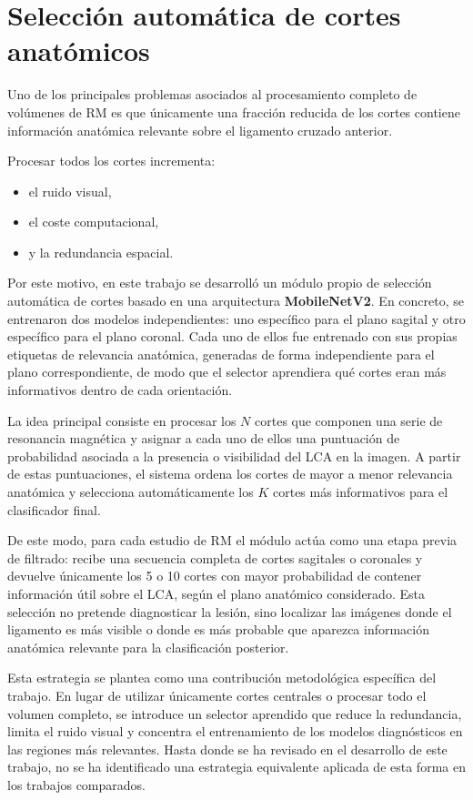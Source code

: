 \section{Selección automática de cortes anatómicos}

Uno de los principales problemas asociados al procesamiento completo de volúmenes de RM es que únicamente una fracción reducida de los cortes contiene información anatómica relevante sobre el ligamento cruzado anterior.

Procesar todos los cortes incrementa:
\begin{itemize}
    \item el ruido visual,
    \item el coste computacional,
    \item y la redundancia espacial.
\end{itemize}

Por este motivo, en este trabajo se desarrolló un módulo propio de selección automática de cortes basado en una arquitectura \textbf{MobileNetV2}. En concreto, se entrenaron dos modelos independientes: uno específico para el plano sagital y otro específico para el plano coronal. Cada uno de ellos fue entrenado con sus propias etiquetas de relevancia anatómica, generadas de forma independiente para el plano correspondiente, de modo que el selector aprendiera qué cortes eran más informativos dentro de cada orientación.

La idea principal consiste en procesar los $N$ cortes que componen una serie de resonancia magnética y asignar a cada uno de ellos una puntuación de probabilidad asociada a la presencia o visibilidad del LCA en la imagen. A partir de estas puntuaciones, el sistema ordena los cortes de mayor a menor relevancia anatómica y selecciona automáticamente los $K$ cortes más informativos para el clasificador final.

De este modo, para cada estudio de RM el módulo actúa como una etapa previa de filtrado: recibe una secuencia completa de cortes sagitales o coronales y devuelve únicamente los 5 o 10 cortes con mayor probabilidad de contener información útil sobre el LCA, según el plano anatómico considerado. Esta selección no pretende diagnosticar la lesión, sino localizar las imágenes donde el ligamento es más visible o donde es más probable que aparezca información anatómica relevante para la clasificación posterior.

Esta estrategia se plantea como una contribución metodológica específica del trabajo. En lugar de utilizar únicamente cortes centrales o procesar todo el volumen completo, se introduce un selector aprendido que reduce la redundancia, limita el ruido visual y concentra el entrenamiento de los modelos diagnósticos en las regiones más relevantes. Hasta donde se ha revisado en el desarrollo de este trabajo, no se ha identificado una estrategia equivalente aplicada de esta forma en los trabajos comparados.

